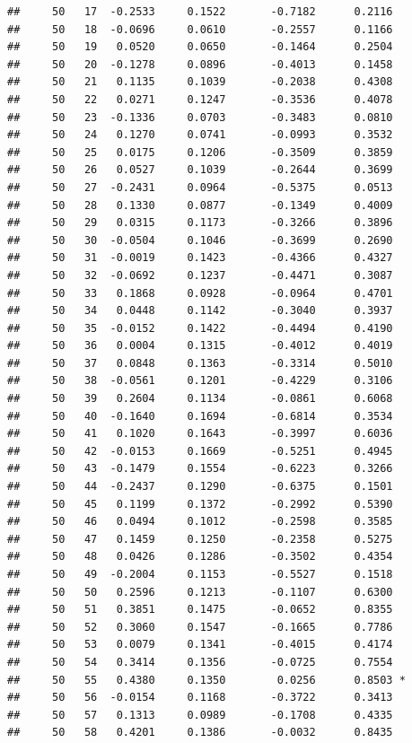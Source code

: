 \documentclass[
]{article}
\begin{document}
\begin{verbatim}
##     50   17  -0.2533     0.1522       -0.7182      0.2116  
##     50   18  -0.0696     0.0610       -0.2557      0.1166  
##     50   19   0.0520     0.0650       -0.1464      0.2504  
##     50   20  -0.1278     0.0896       -0.4013      0.1458  
##     50   21   0.1135     0.1039       -0.2038      0.4308  
##     50   22   0.0271     0.1247       -0.3536      0.4078  
##     50   23  -0.1336     0.0703       -0.3483      0.0810  
##     50   24   0.1270     0.0741       -0.0993      0.3532  
##     50   25   0.0175     0.1206       -0.3509      0.3859  
##     50   26   0.0527     0.1039       -0.2644      0.3699  
##     50   27  -0.2431     0.0964       -0.5375      0.0513  
##     50   28   0.1330     0.0877       -0.1349      0.4009  
##     50   29   0.0315     0.1173       -0.3266      0.3896  
##     50   30  -0.0504     0.1046       -0.3699      0.2690  
##     50   31  -0.0019     0.1423       -0.4366      0.4327  
##     50   32  -0.0692     0.1237       -0.4471      0.3087  
##     50   33   0.1868     0.0928       -0.0964      0.4701  
##     50   34   0.0448     0.1142       -0.3040      0.3937  
##     50   35  -0.0152     0.1422       -0.4494      0.4190  
##     50   36   0.0004     0.1315       -0.4012      0.4019  
##     50   37   0.0848     0.1363       -0.3314      0.5010  
##     50   38  -0.0561     0.1201       -0.4229      0.3106  
##     50   39   0.2604     0.1134       -0.0861      0.6068  
##     50   40  -0.1640     0.1694       -0.6814      0.3534  
##     50   41   0.1020     0.1643       -0.3997      0.6036  
##     50   42  -0.0153     0.1669       -0.5251      0.4945  
##     50   43  -0.1479     0.1554       -0.6223      0.3266  
##     50   44  -0.2437     0.1290       -0.6375      0.1501  
##     50   45   0.1199     0.1372       -0.2992      0.5390  
##     50   46   0.0494     0.1012       -0.2598      0.3585  
##     50   47   0.1459     0.1250       -0.2358      0.5275  
##     50   48   0.0426     0.1286       -0.3502      0.4354  
##     50   49  -0.2004     0.1153       -0.5527      0.1518  
##     50   50   0.2596     0.1213       -0.1107      0.6300  
##     50   51   0.3851     0.1475       -0.0652      0.8355  
##     50   52   0.3060     0.1547       -0.1665      0.7786  
##     50   53   0.0079     0.1341       -0.4015      0.4174  
##     50   54   0.3414     0.1356       -0.0725      0.7554  
##     50   55   0.4380     0.1350        0.0256      0.8503 *
##     50   56  -0.0154     0.1168       -0.3722      0.3413  
##     50   57   0.1313     0.0989       -0.1708      0.4335  
##     50   58   0.4201     0.1386       -0.0032      0.8435  

\end{verbatim}
\end{document}
